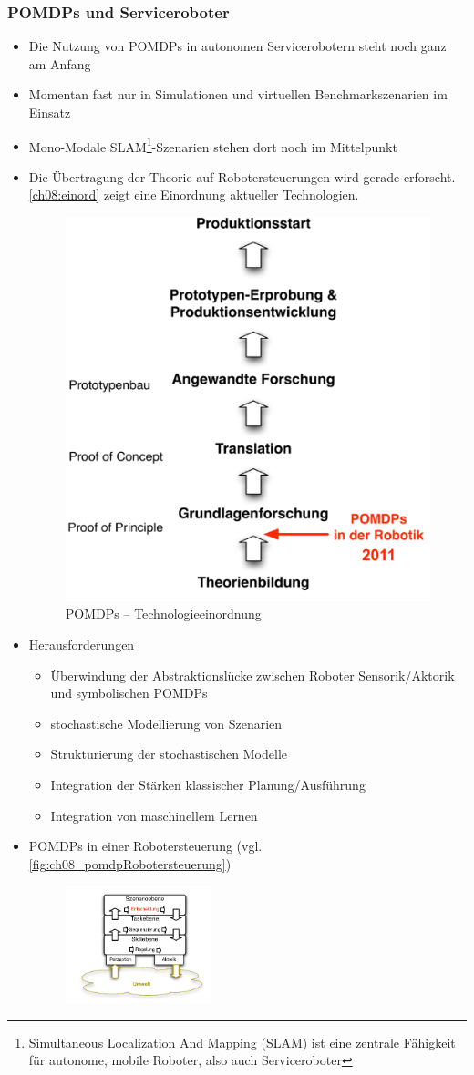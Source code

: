 \subsubsection{POMDPs und Serviceroboter}
\begin{itemize}
	\item Die Nutzung von POMDPs in autonomen Servicerobotern steht noch ganz am Anfang
	\item Momentan fast nur in Simulationen und virtuellen Benchmarkszenarien im Einsatz
	\item Mono-Modale SLAM\footnote{Simultaneous Localization And Mapping (SLAM) ist eine zentrale Fähigkeit für autonome, mobile Roboter, also auch Serviceroboter}-Szenarien stehen dort noch im Mittelpunkt
	\item Die \"Ubertragung der Theorie auf Robotersteuerungen wird gerade erforscht. \autoref{ch08:einord} zeigt eine Einordnung aktueller Technologien.
		\begin{figure}[!h]
			\centering
  			\includegraphics[width=0.3\linewidth]{figures/ch08_einord.png}
  			\centering
			\caption{POMDPs -- Technologieeinordnung}
			\label{ch08:einord}
	\end{figure}
	\item Herausforderungen
	\begin{itemize}
		\item \"Uberwindung der Abstraktionsl\"ucke zwischen Roboter Sensorik/Aktorik und symbolischen POMDPs
		\item stochastische Modellierung von Szenarien
		\item Strukturierung der stochastischen Modelle
		\item Integration der St\"arken klassischer Planung/Ausf\"uhrung
		\item Integration von maschinellem Lernen
	\end{itemize}
	\item POMDPs in einer Robotersteuerung (vgl. \autoref{fig:ch08_pomdpRobotersteuerung})
	\begin{figure}[h!]
		\centering
		\includegraphics[width=0.4\textwidth]{figures/ch08_POMPDRobotersteuerung.png}

\end{figure}
\end{itemize}
